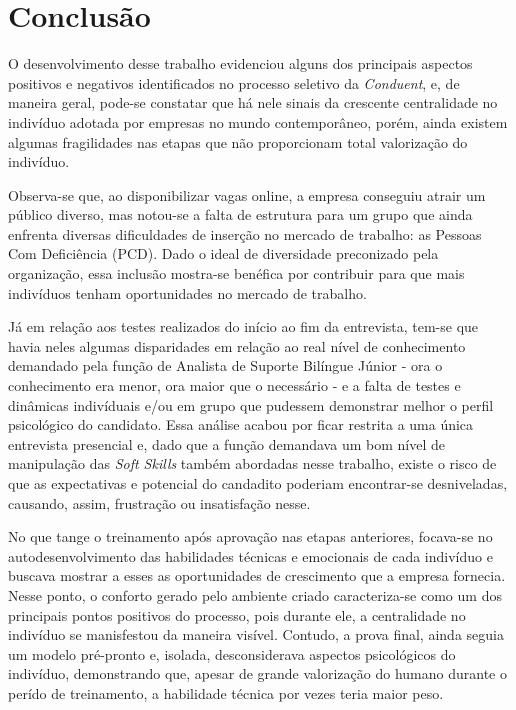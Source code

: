 \documentclass[12pt]{article}
\begin{document}
\section{Conclusão}

O desenvolvimento desse trabalho evidenciou alguns dos principais aspectos positivos e negativos identificados no processo seletivo da \emph{Conduent}, e, de maneira geral, pode-se constatar que há nele sinais da crescente centralidade no indivíduo adotada por empresas no mundo contemporâneo, porém, ainda existem algumas fragilidades nas etapas que não proporcionam total valorização do indivíduo.

Observa-se que, ao disponibilizar vagas online, a empresa conseguiu atrair um público diverso, mas notou-se a falta de estrutura para um grupo que ainda enfrenta diversas dificuldades de inserção no mercado de trabalho: as Pessoas Com Deficiência (PCD). Dado o ideal de diversidade preconizado pela organização, essa inclusão mostra-se benéfica por contribuir para que mais indivíduos tenham oportunidades no mercado de trabalho. 

Já em relação aos testes realizados do início ao fim da entrevista, tem-se que havia neles algumas disparidades em relação ao real nível de conhecimento demandado pela função de Analista de Suporte Bilíngue Júnior - ora o conhecimento era menor, ora maior que o necessário - e a falta de testes e dinâmicas indivíduais e/ou em grupo que pudessem demonstrar melhor o perfil psicológico do candidato. Essa análise acabou por ficar restrita a uma única entrevista presencial e, dado que a função demandava um bom nível de manipulação das \emph{Soft Skills} também abordadas nesse trabalho, existe o risco de que as expectativas e potencial do candadito poderiam encontrar-se desniveladas, causando, assim, frustração ou insatisfação nesse.

No que tange o treinamento após aprovação nas etapas anteriores, focava-se no autodesenvolvimento das habilidades técnicas e emocionais de cada indivíduo e buscava mostrar a esses as oportunidades de crescimento que a empresa fornecia. Nesse ponto, o conforto gerado pelo ambiente criado caracteriza-se como um dos principais pontos positivos do processo, pois durante ele, a centralidade no indivíduo se manisfestou da maneira visível. Contudo, a prova final, ainda seguia um modelo pré-pronto e, isolada, desconsiderava aspectos psicológicos do indivíduo, demonstrando que, apesar de grande valorização do humano durante o perído de treinamento, a habilidade técnica por vezes teria maior peso. 
\end{document}
